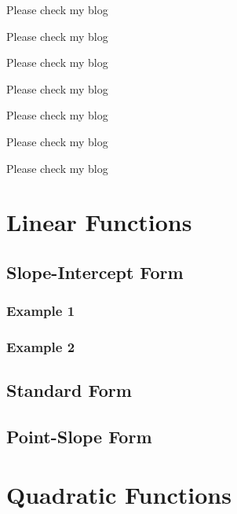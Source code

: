 \documentclass[11pt,  a4paper]{article}
\begin{document}
\begin{normalsize}
Please check my blog
\end{normalsize}

\begin{small}
Please check my blog
\end{small}

\begin{scriptsize}
Please check my blog
\end{scriptsize}

\begin{tiny}
Please check my blog
\end{tiny}

\vspace{1cm}

\begin{center}
Please check my blog
\end{center}

\begin{flushleft}
Please check my blog
\end{flushleft}

\begin{flushright}
Please check my blog
\end{flushright}

\section{Linear Functions}
	\subsection{Slope-Intercept Form}
		\subsubsection{Example 1}
		\subsubsection{Example 2}
	\subsection{Standard Form}
	\subsection{Point-Slope Form}
\section{Quadratic Functions}
\end{document}
